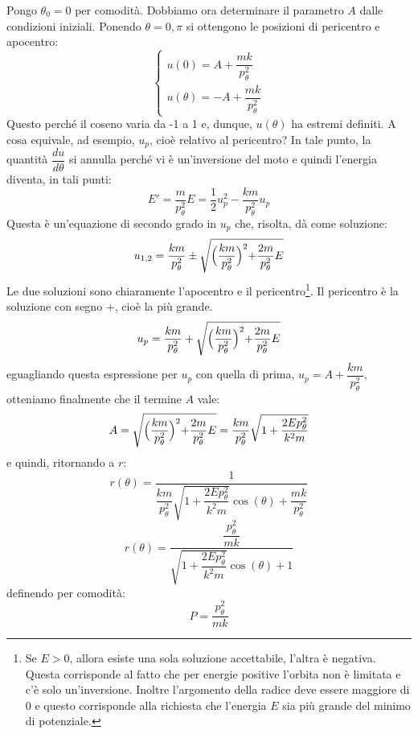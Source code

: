\documentclass[a4paper,openany]{article}
\begin{document}
	Pongo $\theta_{0} = 0$ per comodità. Dobbiamo ora determinare il parametro $A$ dalle condizioni iniziali. 
	Ponendo $\theta =0, \pi$ si ottengono le posizioni di pericentro e apocentro:
	\begin{equation}\label{key}
		\begin{cases}
			u(0) = A + \dfrac{mk}{p_{\theta}^2} \\
			u(\theta) = -A + \dfrac{mk}{p_{\theta}^2}
		\end{cases}
	\end{equation}
	Questo perché il coseno varia da -1 a 1 e, dunque, $u(\theta)$ ha estremi definiti. A cosa equivale, ad esempio, $u_{p}$, cioè relativo al pericentro? In tale punto, la quantità $\dfrac{du}{d\theta}$ si annulla perché vi è un'inversione del moto e quindi l'energia diventa, in tali punti:
	$$
	E' = \dfrac{m}{p_{\theta}^2} E = \dfrac{1}{2}u_{p}^2-\dfrac{km}{p_{\theta}^2}u_p
	$$
	Questa è un'equazione di secondo grado in $u_p$ che, risolta, dà come soluzione:
	$$
	u_{1,2} = \dfrac{km}{p_{\theta}^2}\pm\sqrt{\Bigl(\dfrac{km}{p_{\theta}^2}\Bigl)^2+\dfrac{2m}{p_{\theta}^2}E}
	$$
	Le due soluzioni sono chiaramente l'apocentro e il pericentro\footnote{Se $E>0$, allora esiste una sola soluzione accettabile, l'altra è negativa. Questa corrisponde al fatto che per energie positive l'orbita non è limitata e c'è solo un'inversione. Inoltre l'argomento della radice deve essere maggiore di $0$ e questo corrisponde alla richiesta che l'energia $E$ sia più grande del minimo di potenziale.}. Il pericentro è la soluzione con segno $+$, cioè la più grande.
	\begin{equation}\label{key}
		u_p =  \dfrac{km}{p_{\theta}^2}+\sqrt{\Bigl(\dfrac{km}{p_{\theta}^2}\Bigl)^2+\dfrac{2m}{p_{\theta}^2}E}
	\end{equation}
	eguagliando questa espressione per $u_p$ con quella di prima, $u_p = A + \dfrac{km}{p_{\theta}^2}$, otteniamo finalmente che il termine $A$ vale:
	\begin{equation}\label{key}
		A =\sqrt{\Bigl(\dfrac{km}{p_{\theta}^2}\Bigl)^2+\dfrac{2m}{p_{\theta}^2}E}= \dfrac{km}{p_{\theta}^2}\sqrt{1+\dfrac{2Ep_{\theta}^2}{k^2m}}
	\end{equation}
	e quindi, ritornando a $r$:
	\begin{equation}\label{key}
		r(\theta) = \dfrac{1}{\dfrac{km}{p_{\theta}^2}\sqrt{1+\dfrac{2Ep_{\theta}^2}{k^2m}}\cos(\theta)+\dfrac{mk}{p_{\theta}^2}}
	\end{equation}
	\begin{equation}\label{key}
		r(\theta) = \dfrac{\dfrac{p_{\theta}^2}{mk}}{\sqrt{1+\dfrac{2Ep_{\theta}^2}{k^2m}}\cos(\theta)+1}
	\end{equation}
	definendo per comodità:
	\begin{equation}\label{key}
		P = \dfrac{p_{\theta}^2}{mk}
	\end{equation}
	
\end{document}
